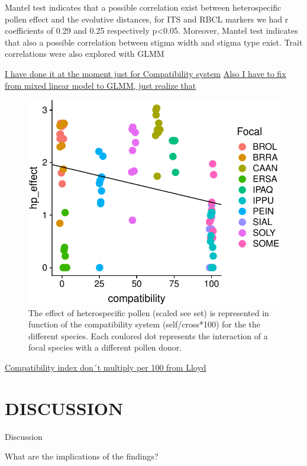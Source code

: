 \documentclass[11pt,a4paper]{article}
\begin{document}
Mantel test indicates that a possible correlation exist between
heterospecific pollen effect and the evolutive distances, for ITS and
RBCL markers we had r coefficients of 0.29 and 0.25 respectively
p\textless{}0.05. Moreover, Mantel test indicates that also a possible
correlation between stigma width and stigma type exist. Trait
correlations were also explored with GLMM

\href{Jose}{I have done it at the moment just for Compatibility system}
\href{Jose}{Also I have to fix from mixed linear model to GLMM, just
realize that}

\newpage

\begin{figure}
\centering
\includegraphics{output/figures/unnamed-chunk-3-1.pdf}
\caption{The effect of heterospecific pollen (scaled see set) is
represented in function of the compatibility system (self/cross*100) for
the the different species. Each coulored dot represents the interaction
of a focal species with a different pollen donor.}
\end{figure}

\href{Jose}{Compatibility index don´t multiply per 100 from Lloyd}

\newpage

\section{DISCUSSION}\label{discussion}

Discussion

What are the implications of the findings?
\end{document}
